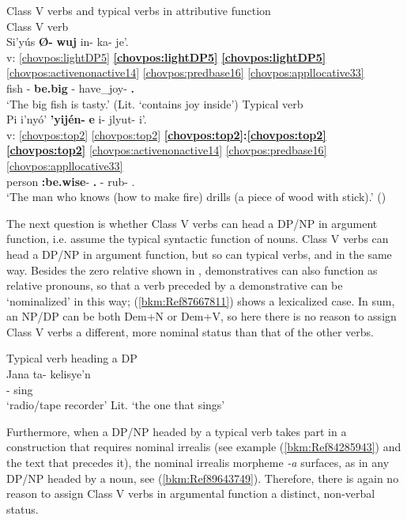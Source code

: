 \documentclass[output=paper]{langscibook}
\begin{document}
\ea\label{ex:chor:key:38} Class V verbs and typical verbs in attributive function\\ 
    \ea\label{bkm:Ref87667510} Class V verb \\ {
    \glll {} Si'yús \textbf{Ø{}-} \textbf{wuj} in{}- ka{}- je'.\\ 
    v: \ref{chovpos:lightDP5} \textbf{\ref{chovpos:lightDP5}} \textbf{\ref{chovpos:lightDP5}} \ref{chovpos:activenonactive14} \ref{chovpos:predbase16} \ref{chovpos:appllocative33}\\ 
    {} fish \Third{}- \textbf{be.big} \Third{}- have\_joy{}- \textbf{\Ap.\Loc{}}\\
    \glt `The big fish is tasty.' (Lit. `contains joy inside')
    }
    \ex\label{bkm:Ref87667507} Typical verb\\ {
    \glll {} Pi i'nyó' \textbf{'yijén-} \textbf{e} i- jlyut- i'.\\ 
    v: \ref{chovpos:top2} \ref{chovpos:top2} \textbf{\ref{chovpos:top2}:\ref{chovpos:top2}} \textbf{\ref{chovpos:top2}} \ref{chovpos:activenonactive14} \ref{chovpos:predbase16} \ref{chovpos:appllocative33}\\ 
    {} \Dem{} person \textbf{\Third:be.wise}- \textbf{\Ap.\Ins{}}  \Third{}- rub- \Ap.\Loc{}\\ 
    \glt `The man who knows (how to make fire) drills (a piece of wood with stick).' (\citealt[62]{DraysonGomez2000}) 
    }
    \z 
\z 

The next question is whether Class V verbs can head a DP/NP in argument function, i.e. assume the typical syntactic function of nouns. Class V verbs can head a DP/NP in argument function, but so can typical verbs, and in the same way. Besides the zero relative shown in , demonstratives can also function as relative pronouns, so that a verb preceded by a demonstrative can be `nominalized' in this way; (\ref{bkm:Ref87667811}) shows a lexicalized case. In sum, an NP/DP can be both Dem+N or Dem+V, so here there is no reason to assign Class V verbs a different, more nominal status than that of the other verbs.

\ea\label{bkm:Ref90302758}\label{bkm:Ref87667811} Typical verb heading a DP\\ 
\gll Jana ta- kelisye'n\\ 
\Dem{} \Third{}- sing\\
\glt `radio/tape recorder' Lit. `the one that sings'
\z 

Furthermore, when a DP/NP headed by a typical verb takes part in a construction that requires nominal irrealis (see example (\ref{bkm:Ref84285943}) and the text that precedes it), the nominal irrealis morpheme \textit{-a} surfaces, as in any DP/NP headed by a noun, see (\ref{bkm:Ref89643749}). Therefore, there is again no reason to assign Class V verbs in argumental function a distinct, non-verbal status.
\end{document}
